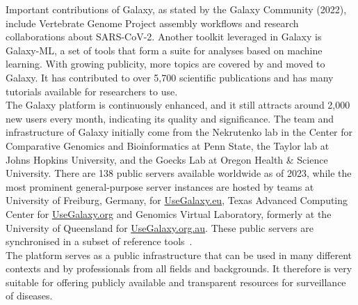 Important contributions of Galaxy, as stated by the Galaxy Community (2022), include Vertebrate Genome Project assembly workflows and research collaborations about \ac{SARS-CoV-2}. Another toolkit leveraged in Galaxy is Galaxy-ML, a set of tools that form a suite for analyses based on machine learning. With growing publicity, more topics are covered by and moved to Galaxy. It has contributed to over 5,700 scientific publications and has many tutorials available for researchers to use. \\
The Galaxy platform is continuously enhanced, and it still attracts around 2,000 new users every month, indicating its quality and significance. The team and infrastructure of Galaxy initially come from the Nekrutenko lab in the Center for Comparative Genomics and Bioinformatics at Penn State, the Taylor lab at Johns Hopkins University, and the Goecks Lab at Oregon Health \& Science University. There are 138 public servers available worldwide as of 2023, while the most prominent general-purpose server instances are hosted by teams at University of Freiburg, Germany, for \href{https://usegalaxy.eu/}{UseGalaxy.eu}, Texas Advanced Computing Center for \href{https://usegalaxy.org/}{UseGalaxy.org} and Genomics Virtual Laboratory, formerly at the University of Queensland for \href{https://usegalaxy.org.au/}{UseGalaxy.org.au}. These public servers are synchronised in a subset of reference tools~\cite{10.1093/nar/gkac247}. \\
The platform serves as a public infrastructure that can be used in many different contexts and by professionals from all fields and backgrounds. It therefore is very suitable for offering publicly available and transparent resources for surveillance of diseases.

